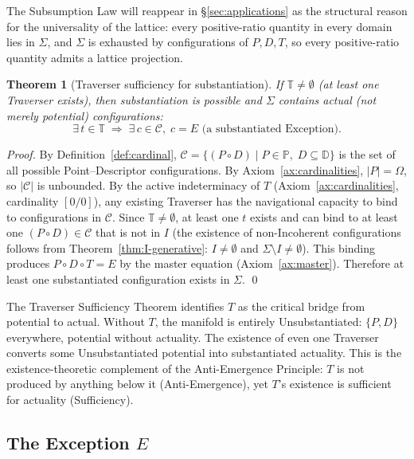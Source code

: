 \documentclass[11pt,a4paper]{article}
\newtheorem{theorem}{Theorem}[section]
\theoremstyle{definition}
\theoremstyle{remark}
\begin{document}
The Subsumption Law will reappear in \S\ref{sec:applications} as the structural reason for the universality of the lattice: every positive-ratio quantity in every domain lies in $\Sigma$, and $\Sigma$ is exhausted by configurations of $P,D,T$, so every positive-ratio quantity admits a lattice projection.

\begin{theorem}[Traverser sufficiency for substantiation]\label{thm:T-sufficiency}
If $\mathbb{T} \neq \emptyset$ (at least one Traverser exists), then substantiation is possible and $\Sigma$ contains actual (not merely potential) configurations:
\[
\exists\, t \in \mathbb{T} \;\Longrightarrow\; \exists\, c \in \mathcal{C},\; c = E \text{ (a substantiated Exception)}.
\]
\end{theorem}

\begin{proof}
By Definition~\ref{def:cardinal}, $\mathcal{C} = \{(P \circ D) \mid P \in \mathbb{P},\; D \subseteq \mathbb{D}\}$ is the set of all possible Point--Descriptor configurations. By Axiom~\ref{ax:cardinalities}, $|P| = \Omega$, so $|\mathcal{C}|$ is unbounded. By the active indeterminacy of $T$ (Axiom~\ref{ax:cardinalities}, cardinality $[0/0]$), any existing Traverser has the navigational capacity to bind to configurations in $\mathcal{C}$. Since $\mathbb{T} \neq \emptyset$, at least one $t$ exists and can bind to at least one $(P \circ D) \in \mathcal{C}$ that is not in $I$ (the existence of non-Incoherent configurations follows from Theorem~\ref{thm:I-generative}: $I \neq \emptyset$ and $\Sigma \setminus I \neq \emptyset$). This binding produces $P \circ D \circ T = E$ by the master equation (Axiom~\ref{ax:master}). Therefore at least one substantiated configuration exists in $\Sigma$. \qed
\end{proof}

The Traverser Sufficiency Theorem identifies $T$ as the critical bridge from potential to actual. Without $T$, the manifold is entirely Unsubstantiated: $\{P,D\}$ everywhere, potential without actuality. The existence of even one Traverser converts some Unsubstantiated potential into substantiated actuality. This is the existence-theoretic complement of the Anti-Emergence Principle: $T$ is not produced by anything below it (Anti-Emergence), yet $T$'s existence is sufficient for actuality (Sufficiency).

\subsection{The Exception $E$}\label{subsec:exception}
\end{document}
